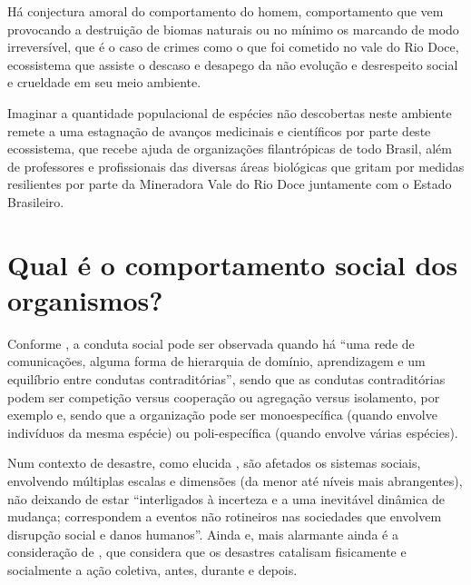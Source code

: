 \documentclass[
article,			%
11pt,				%
oneside,			%
a4paper,			%
english,			%
brazil,				%
sumario=tradicional
]{abntex2}
\begin{document}
	Há conjectura amoral do comportamento do homem, comportamento que vem provocando a destruição de biomas naturais ou no mínimo os marcando de modo irreversível, que é o caso de crimes como o que foi cometido no vale do Rio Doce, ecossistema que assiste o descaso e desapego da não evolução e desrespeito social e crueldade em seu meio ambiente.
	
	Imaginar a quantidade populacional de espécies não descobertas neste ambiente  remete a uma estagnação de avanços medicinais e científicos  por parte deste ecossistema, que recebe ajuda de organizações filantrópicas de todo Brasil, além de professores e profissionais das diversas áreas biológicas que gritam por medidas resilientes por parte da Mineradora Vale do Rio Doce juntamente com o Estado Brasileiro.
	
	\section{Qual é o comportamento social dos organismos?} \label{s:comportamento}
	
	Conforme , a conduta social pode ser observada quando há ``uma rede de comunicações, alguma forma de hierarquia de domínio, aprendizagem e um equilíbrio entre condutas contraditórias'', sendo que as condutas contraditórias podem ser competição versus cooperação ou agregação versus isolamento, por exemplo e, sendo que a organização pode ser monoespecífica (quando envolve indivíduos da mesma espécie) ou poli-específica (quando envolve várias espécies).
	
	Num contexto de desastre, como elucida , são afetados os sistemas sociais, envolvendo múltiplas escalas e dimensões (da menor até níveis mais abrangentes), não deixando de estar ``interligados à incerteza e a uma inevitável dinâmica  de  mudança;  correspondem  a  eventos  não rotineiros nas sociedades que envolvem disrupção social e  danos  humanos''. Ainda e, mais alarmante ainda é a consideração de , que considera que os desastres catalisam fisicamente e socialmente a ação coletiva, antes, durante e depois.
	
\end{document}
